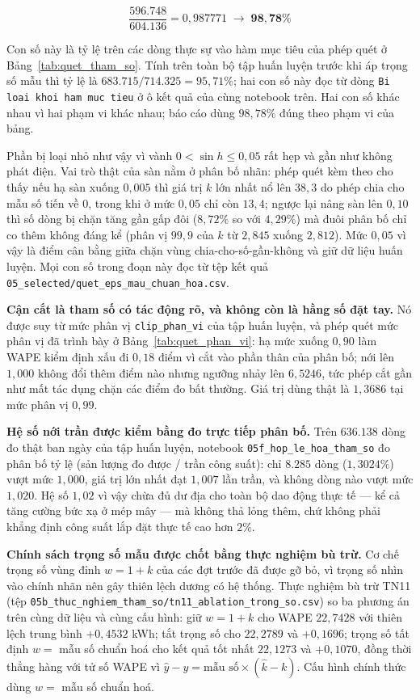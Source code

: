 \begin{equation}
\frac{596.748}{604.136} = 0{,}987771 \;\longrightarrow\; \mathbf{98{,}78\%}
\end{equation}

Con số này là tỷ lệ trên các dòng thực sự vào hàm mục tiêu của phép quét ở
Bảng~\ref{tab:quet_tham_so}. Tính trên toàn bộ tập huấn luyện trước khi áp trọng số mẫu thì
tỷ lệ là $683.715 / 714.325 = 95{,}71\%$; hai con số này đọc từ dòng
\texttt{Bi loai khoi ham muc tieu} ở ô kết quả của cùng notebook trên. Hai con số khác nhau vì hai phạm vi khác nhau; báo
cáo dùng $98{,}78\%$ đúng theo phạm vi của bảng.

Phần bị loại nhỏ như vậy vì vành $0 < \sin h \le 0{,}05$ rất hẹp và gần như không phát điện.
Vai trò thật của sàn nằm ở phân bố nhãn: phép quét kèm theo cho thấy nếu hạ sàn xuống
$0{,}005$ thì giá trị $k$ lớn nhất nổ lên $38{,}3$ do phép chia cho mẫu số tiến về $0$, trong
khi ở mức $0{,}05$ chỉ còn $13{,}4$; ngược lại nâng sàn lên $0{,}10$ thì số dòng bị chặn tăng
gần gấp đôi ($8{,}72\%$ so với $4{,}29\%$) mà đuôi phân bố chỉ co thêm không đáng kể (phân vị
$99{,}9$ của $k$ từ $2{,}845$ xuống $2{,}812$). Mức $0{,}05$ vì vậy là điểm cân bằng giữa chặn
vùng chia-cho-số-gần-không và giữ dữ liệu huấn luyện. Mọi con số trong đoạn này đọc từ tệp kết
quả \texttt{05\_selected/quet\_eps\_mau\_chuan\_hoa.csv}.

\textbf{Cận cắt là tham số có tác động rõ, và không còn là hằng số đặt tay.} Nó được suy từ
mức phân vị \texttt{clip\_phan\_vi} của tập huấn luyện, và phép quét mức phân vị đã trình bày ở
Bảng~\ref{tab:quet_phan_vi}: hạ mức xuống $0{,}90$ làm WAPE kiểm định xấu đi $0{,}18$ điểm vì
cắt vào phần thân của phân bố; nới lên $1{,}000$ không đổi thêm điểm nào nhưng ngưỡng nhảy lên
$6{,}5246$, tức phép cắt gần như mất tác dụng chặn các điểm đo bất thường. Giá trị dùng thật
là $1{,}3686$ tại mức phân vị $0{,}99$.

\textbf{Hệ số nới trần được kiểm bằng đo trực tiếp phân bố.} Trên $636.138$ dòng đo thật ban
ngày của tập huấn luyện, notebook \texttt{05f\_hop\_le\_hoa\_tham\_so} đo phân bố tỷ lệ (sản
lượng đo được / trần công suất): chỉ $8.285$ dòng ($1{,}3024\%$) vượt mức $1{,}000$, giá trị
lớn nhất đạt $1{,}007$ lần trần, và không dòng nào vượt mức $1{,}020$. Hệ số $1{,}02$ vì vậy
chừa đủ dư địa cho toàn bộ dao động thực tế --- kể cả tăng cường bức xạ ở mép mây --- mà không
thả lỏng thêm, chứ không phải khẳng định công suất lắp đặt thực tế cao hơn $2\%$.

\textbf{Chính sách trọng số mẫu được chốt bằng thực nghiệm bù trừ.} Cơ chế trọng số vùng đỉnh
$w = 1 + k$ của các đợt trước đã được gỡ bỏ, vì trọng số nhìn vào chính nhãn nên gây thiên
lệch dương có hệ thống. Thực nghiệm bù trừ TN11 (tệp
\texttt{05b\_thuc\_nghiem\_tham\_so/tn11\_ablation\_trong\_so.csv}) so ba phương án trên cùng
dữ liệu và cùng cấu hình: giữ $w = 1 + k$ cho WAPE $22{,}7428$ với thiên lệch trung bình
$+0{,}4532$ kWh; tắt trọng số cho $22{,}2789$ và $+0{,}1696$; trọng số tất định $w =$ mẫu số
chuẩn hoá cho kết quả tốt nhất $22{,}1273$ và $+0{,}1070$, đồng thời thẳng hàng với tử số
WAPE vì $\hat{y} - y = \text{mẫu số} \times (\hat{k} - k)$. Cấu hình chính thức dùng
$w =$ mẫu số chuẩn hoá.

